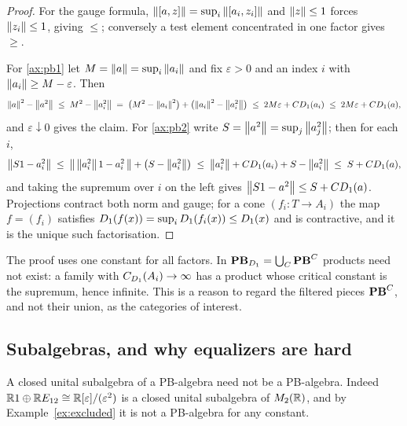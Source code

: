 \begin{proof}
For the gauge formula, $\left\lVert[a,z]\right\rVert=\sup_i\left\lVert[a_i,z_i]\right\rVert$ and $\left\lVert z\right\rVert\le1$
forces $\left\lVert z_i\right\rVert\le1$, giving $\le$; conversely a test element concentrated in
one factor gives $\ge$.

For \eqref{ax:pb1} let $M=\left\lVert a\right\rVert=\sup_i\left\lVert a_i\right\rVert$ and fix $\varepsilon>0$ and
an index $i$ with $\left\lVert a_i\right\rVert\ge M-\varepsilon$.  Then
\[
  \left\lVert a\right\rVert^2-\left\lVert a^2\right\rVert
  \;\le\;M^2-\left\lVert a_i^2\right\rVert
  \;=\;\bigl(M^2-\left\lVert a_i\right\rVert^2\bigr)+\bigl(\left\lVert a_i\right\rVert^2-\left\lVert a_i^2\right\rVert\bigr)
  \;\le\;2M\varepsilon+CD_1(a_i)
  \;\le\;2M\varepsilon+CD_1(a),
\]
and $\varepsilon\downarrow0$ gives the claim.  For \eqref{ax:pb2} write
$S=\left\lVert a^2\right\rVert=\sup_j\left\lVert a_j^2\right\rVert$; then for each $i$,
\[
  \bigl\lVert S1-a_i^2\bigr\rVert
  \;\le\;\bigl\lVert\,\left\lVert a_i^2\right\rVert1-a_i^2\,\bigr\rVert+\bigl(S-\left\lVert a_i^2\right\rVert\bigr)
  \;\le\;\left\lVert a_i^2\right\rVert+CD_1(a_i)+S-\left\lVert a_i^2\right\rVert
  \;\le\;S+CD_1(a),
\]
and taking the supremum over $i$ on the left gives
$\bigl\lVert S1-a^2\bigr\rVert\le S+CD_1(a)$.  Projections contract both norm and gauge; for
a cone $(f_i:T\to A_i)$ the map $f=(f_i)$ satisfies
$D_1(f(x))=\sup_iD_1(f_i(x))\le D_1(x)$ and is contractive, and it
is the unique such factorisation.
\end{proof}

\begin{remark}
The proof uses one constant for all factors.  In $\mathbf{PB}_{D_1}=\bigcup_C\mathbf{PB}^C$
products need not exist: a family with $C_{D_1}(A_i)\to\infty$ has a product
whose critical constant is the supremum, hence infinite.  This is a reason to
regard the filtered pieces $\mathbf{PB}^C$, and not their union, as the categories of
interest.
\end{remark}

\subsection{Subalgebras, and why equalizers are hard}

\begin{proposition}
\label{prop:not-closed-subalgebras}
A closed unital subalgebra of a PB-algebra need not be a PB-algebra.  Indeed
$\mathbb{R}1\oplus\mathbb{R} E_{12}\cong\mathbb{R}[\varepsilon]/(\varepsilon^2)$ is a closed unital
subalgebra of $M_2(\mathbb{R})$, and by Example~\ref{ex:excluded} it is not a
PB-algebra for any constant.
\end{proposition}

